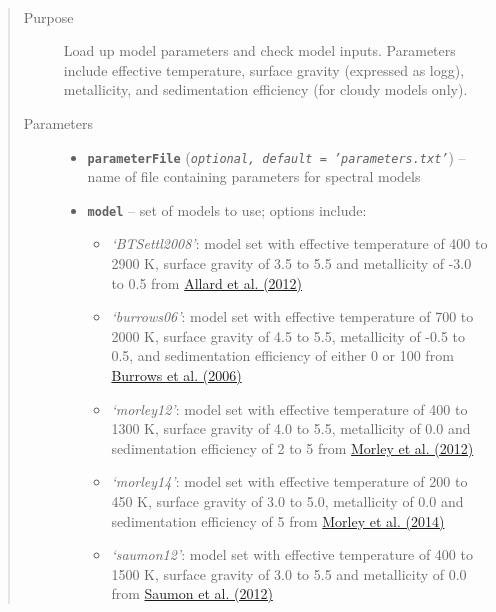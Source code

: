 \documentclass[letterpaper,10pt,english]{sphinxmanual}
\begin{document}
\begin{fulllineitems}
\label{splat_model:splat_model.loadModelParameters}~\begin{quote}\begin{description}
\item[{Purpose}] \leavevmode
Load up model parameters and check model inputs. Parameters include
effective temperature, surface gravity (expressed as logg), metallicity,
and sedimentation efficiency (for cloudy models only).

\item[{Parameters}] \leavevmode\begin{itemize}
\item {} 
\textbf{\texttt{parameterFile}} (\emph{\texttt{optional, default = 'parameters.txt'}}) -- name of file containing parameters for spectral models

\item {} 
\textbf{\texttt{model}} -- 
set of models to use; options include:
\begin{itemize}
\item {} 
\emph{`BTSettl2008'}: model set with effective temperature of 400 to 2900 K, surface gravity of 3.5 to 5.5 and metallicity of -3.0 to 0.5
from \href{http://adsabs.harvard.edu/abs/2012RSPTA.370.2765A}{Allard et al. (2012)}

\item {} 
\emph{`burrows06'}: model set with effective temperature of 700 to 2000 K, surface gravity of 4.5 to 5.5, metallicity of -0.5 to 0.5,
and sedimentation efficiency of either 0 or 100 from \href{http://adsabs.harvard.edu/abs/2006ApJ...640.1063B}{Burrows et al. (2006)}

\item {} 
\emph{`morley12'}: model set with effective temperature of 400 to 1300 K, surface gravity of 4.0 to 5.5, metallicity of 0.0
and sedimentation efficiency of 2 to 5 from \href{http://adsabs.harvard.edu/abs/2012ApJ...756..172M}{Morley et al. (2012)}

\item {} 
\emph{`morley14'}: model set with effective temperature of 200 to 450 K, surface gravity of 3.0 to 5.0, metallicity of 0.0
and sedimentation efficiency of 5 from \href{http://adsabs.harvard.edu/abs/2014ApJ...787...78M}{Morley et al. (2014)}

\item {} 
\emph{`saumon12'}: model set with effective temperature of 400 to 1500 K, surface gravity of 3.0 to 5.5 and metallicity of 0.0
from \href{http://adsabs.harvard.edu/abs/2012ApJ...750...74S}{Saumon et al. (2012)}


\end{itemize}
\end{itemize}
\end{description}
\end{quote}
\end{fulllineitems}
\end{document}
